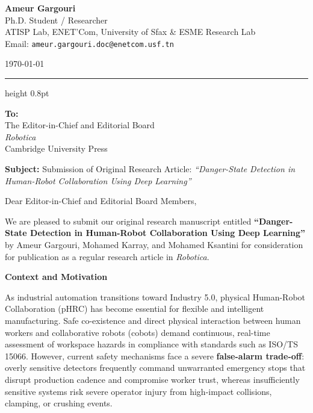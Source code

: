 \documentclass[11pt,a4paper]{article}
\begin{document}
\begin{minipage}[t]{0.68\textwidth}
    {\large \textbf{Ameur Gargouri}} \\
    Ph.D. Student / Researcher \\
    ATISP Lab, ENET'Com, University of Sfax \& ESME Research Lab \\
    Email: \texttt{ameur.gargouri.doc@enetcom.usf.tn}
\end{minipage}
\hfill
\begin{minipage}[t]{0.28\textwidth}
    \raggedleft
    \today
\end{minipage}

\vspace{0.8em}
\hrule height 0.8pt
\vspace{0.8em}

\textbf{To:} \\
The Editor-in-Chief and Editorial Board \\
\textit{Robotica} \\
Cambridge University Press

\vspace{0.6em}

\textbf{Subject:} Submission of Original Research Article: \textit{``Danger-State Detection in Human-Robot Collaboration Using Deep Learning''}

\vspace{0.5em}

Dear Editor-in-Chief and Editorial Board Members,

We are pleased to submit our original research manuscript entitled \textbf{``Danger-State Detection in Human-Robot Collaboration Using Deep Learning''} by Ameur Gargouri, Mohamed Karray, and Mohamed Ksantini for consideration for publication as a regular research article in \textit{Robotica}.

\vspace{0.3em}
{\large\textbf{Context and Motivation}}\par\vspace{2pt}
As industrial automation transitions toward Industry 5.0, physical Human-Robot Collaboration (pHRC) has become essential for flexible and intelligent manufacturing. Safe co-existence and direct physical interaction between human workers and collaborative robots (cobots) demand continuous, real-time assessment of workspace hazards in compliance with standards such as ISO/TS 15066. However, current safety mechanisms face a severe \textbf{false-alarm trade-off}: overly sensitive detectors frequently command unwarranted emergency stops that disrupt production cadence and compromise worker trust, whereas insufficiently sensitive systems risk severe operator injury from high-impact collisions, clamping, or crushing events.
\end{document}
